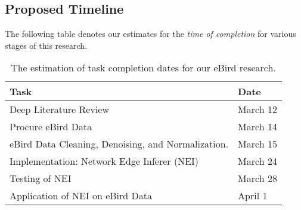 \documentclass[11pt]{article}
\begin{document}
\begin{multicols}{2}
\section{Proposed Timeline} \vspace{-10 pt}
The following table denotes our estimates for the \textit{time of completion} for various stages of this research.
\begin{table*}
\centering
\begin{tabular}{|ll|} \hline
Task & Date\\ \hline
Deep Literature Review & March 12  \\
Procure eBird Data & March 14 \\
eBird Data Cleaning, Denoising, and Normalization. & March 15 \\
Implementation: Network Edge Inferer (NEI) &March 24 \\
Testing of NEI & March 28  \\
Application of NEI on eBird Data & April 1 \\

\hline\end{tabular}
\caption{The estimation of task completion dates for our eBird research.}
\label{table:chart}
\end{table*}

\end{multicols}


\end{document}
